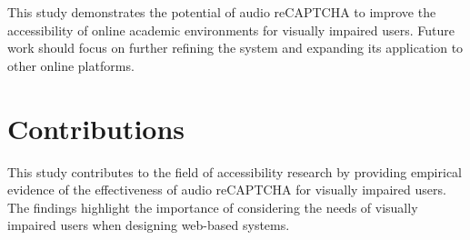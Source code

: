 \documentclass{article}
\begin{document}
This study demonstrates the potential of audio reCAPTCHA to improve the accessibility of online academic environments for visually impaired users. Future work should focus on further refining the system and expanding its application to other online platforms.

\section{Contributions}
\label{sec:contributions}

This study contributes to the field of accessibility research by providing empirical evidence of the effectiveness of audio reCAPTCHA for visually impaired users. The findings highlight the importance of considering the needs of visually impaired users when designing web-based systems.



\end{document}

